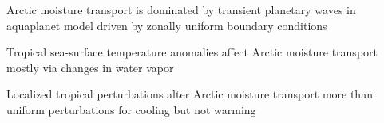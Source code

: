\documentclass[draft]{agujournal2019}
\begin{document}





\begin{keypoints}

\item  Arctic moisture transport is dominated by transient planetary waves in aquaplanet model driven by zonally uniform boundary conditions

\item Tropical sea-surface temperature anomalies affect Arctic moisture transport mostly via changes in water vapor 

\item Localized tropical perturbations alter Arctic moisture transport more than uniform perturbations for cooling but not warming


\end{keypoints}

%
%

%
%
\end{document}
